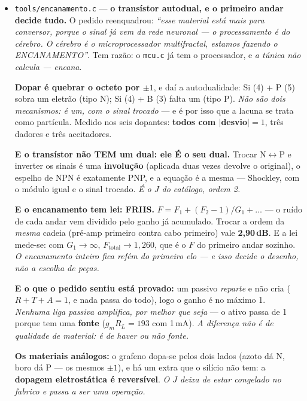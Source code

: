 \documentclass[11pt]{article}
\newcommand{\code}[1]{\texttt{\small #1}}
\theoremstyle{plain}
\theoremstyle{remark}
\begin{document}
\begin{itemize}
\emph{A fração que absorve é 200 vezes menor que a que dissipa, e a que a eletrónica quer é a que a
mecânica não quer.} \textbf{A saída não é uma liga ótima: são quatro CAMADAS da mesma química} --- e
elas saem ordenadas sozinhas, da mais diluída (fora, absorve) à mais carregada (dentro, dissipa).
\emph{É a mesma química a fazer quatro papéis por gradiente.} \textbf{13 unidades, resíduo 0.}


\item \code{tools/encanamento.c} --- \textbf{o transístor autodual, e o primeiro andar decide tudo.}
O pedido reenquadrou: \emph{``esse material está mais para conversor, porque o sinal já vem da rede
neuronal --- o processamento é do cérebro. O cérebro é o microprocessador multifractal, estamos
fazendo o ENCANAMENTO''}. Tem razão: o \code{mcu.c} já tem o processador, e \emph{a túnica não
calcula --- encana}.

\textbf{Dopar é quebrar o octeto por $\pm1$}, e daí a autodualidade: Si (4) + P (5) sobra um eletrão
(tipo N); Si (4) + B (3) falta um (tipo P). \emph{Não são dois mecanismos: é um, com o sinal
trocado} --- e é por isso que a lacuna se trata como partícula. Medido nos seis dopantes:
\textbf{todos com $|$desvio$| = 1$}, três dadores e três aceitadores.

\textbf{E o transístor não TEM um dual: ele É o seu dual.} Trocar N$\leftrightarrow$P e inverter os
sinais é uma \textbf{involução} (aplicada duas vezes devolve o original), o espelho de NPN é
exatamente PNP, e a equação é a mesma --- Shockley, com o módulo igual e o sinal trocado. \emph{É o
$J$ do catálogo, ordem 2.}

\textbf{E o encanamento tem lei: FRIIS.} $F = F_1 + (F_2-1)/G_1 + \dots$ --- o ruído de cada andar
vem dividido pelo ganho já acumulado. Trocar a ordem da \emph{mesma} cadeia (pré-amp primeiro contra
cabo primeiro) vale \textbf{2,90\,dB}. E a lei mede-se: com $G_1\to\infty$, $F_{\text{total}}\to
1{,}260$, que é o $F$ do primeiro andar sozinho. \emph{O encanamento inteiro fica refém do primeiro
elo --- e isso decide o desenho, não a escolha de peças.}

\textbf{E o que o pedido sentiu está provado:} um passivo \emph{reparte} e não cria ($R+T+A=1$, e
nada passa do todo), logo o ganho é no máximo 1. \emph{Nenhuma liga passiva amplifica, por melhor que
seja} --- o ativo passa de 1 porque tem uma \textbf{fonte} ($g_m R_L = 193$ com 1\,mA). \emph{A
diferença não é de qualidade de material: é de haver ou não fonte.}

\textbf{Os materiais análogos:} o grafeno dopa-se pelos dois lados (azoto dá N, boro dá P --- os
mesmos $\pm1$), e há um extra que o silício não tem: a \textbf{dopagem eletrostática é reversível}.
\emph{O $J$ deixa de estar congelado no fabrico e passa a ser uma operação.}


\end{itemize}
\end{document}
